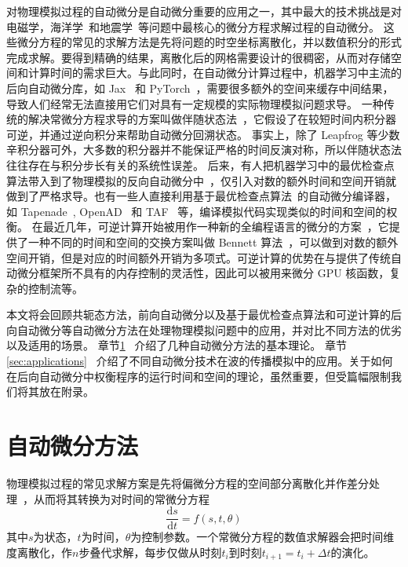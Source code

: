 \documentclass[A4,twoside,UTF8]{ctexart}
\def\D{\mathrm{d}}
\begin{document}
对物理模拟过程的自动微分是自动微分重要的应用之一，其中最大的技术挑战是对电磁学，海洋学~\cite{Heimbach2005}和地震学~\cite{Symes2007,Zhu2021}等问题中最核心的微分方程求解过程的自动微分。
这些微分方程的常见的求解方法是先将问题的时空坐标离散化，并以数值积分的形式完成求解。要得到精确的结果，离散化后的网格需要设计的很稠密，从而对存储空间和计算时间的需求巨大。与此同时，在自动微分计算过程中，机器学习中主流的后向自动微分库，如 Jax~\cite{James2018} 和 PyTorch~\cite{Paszke2019}，需要很多额外的空间来缓存中间结果，导致人们经常无法直接用它们对具有一定规模的实际物理模拟问题求导。
一种传统的解决常微分方程求导的方案叫做伴随状态法~\cite{Plessix2006,Chen2018}，它假设了在较短时间内积分器可逆，并通过逆向积分来帮助自动微分回溯状态。
事实上，除了 Leapfrog 等少数辛积分器可外，大多数的积分器并不能保证严格的时间反演对称，所以伴随状态法往往存在与积分步长有关的系统性误差。
后来，有人把机器学习中的最优检查点算法带入到了物理模拟的反向自动微分中~\cite{Symes2007}，仅引入对数的额外时间和空间开销就做到了严格求导。也有一些人直接利用基于最优检查点算法~\cite{Griewank1992,Forget2015}的自动微分编译器，如 Tapenade~\cite{Hascoet2013}, OpenAD~\cite{Utke2008} 和 TAF~\cite{Heimbach2005} 等，编译模拟代码实现类似的时间和空间的权衡。
在最近几年，可逆计算开始被用作一种新的全编程语言的微分的方案~\cite{Liu2020b}，它提供了一种不同的时间和空间的交换方案叫做 Bennett 算法~\cite{Levine1990}，可以做到对数的额外空间开销，但是对应的时间额外开销为多项式。可逆计算的优势在与提供了传统自动微分框架所不具有的内存控制的灵活性，因此可以被用来微分 GPU 核函数，复杂的控制流等。

   本文将会回顾共轭态方法，前向自动微分以及基于最优检查点算法和可逆计算的后向自动微分等自动微分方法在处理物理模拟问题中的应用，并对比不同方法的优劣以及适用的场景。
章节\ref{sec:forwardbackward}~ 介绍了几种自动微分方法的基本理论。
章节\ref{sec:applications}~ 介绍了不同自动微分技术在波的传播模拟中的应用。关于如何在后向自动微分中权衡程序的运行时间和空间的理论，虽然重要，但受篇幅限制我们将其放在附录。

\section{自动微分方法}\label{sec:forwardbackward}

    物理模拟过程的常见求解方案是先将偏微分方程的空间部分离散化并作差分处理~\cite{Grote2010}，从而将其转换为对时间的常微分方程
    $$\frac{\D s}{\D t} = f(s, t, \theta)$$
其中$s$为状态，$t$为时间，$\theta$为控制参数。一个常微分方程的数值求解器会把时间维度离散化，作$n$步叠代求解，每步仅做从时刻$t_i$到时刻$t_{i+1} = t_{i}+\Delta t$的演化。
\end{document}
